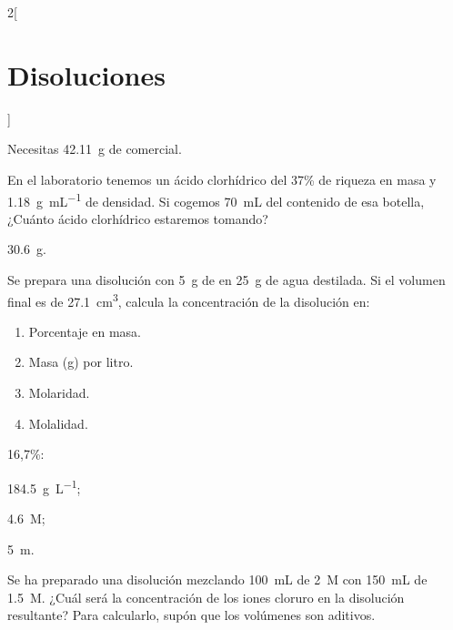 \documentclass[10pt]{article}
\begin{document}
\begin{multicols}{2}[
  \section{Disoluciones}
  ]
  \begin{solution}
    Necesitas \SI{42.11}{\gram} de  comercial.
  \end{solution}




  \begin{exercise}[
      tags    = {termodinámica, entalpía, entalpia de reacción, calor},
      topics  = {química, termoquímica, termodinámica},
      source  = {FQ 1B SAN 2015, p92, e33},
    ]
    En el laboratorio tenemos un ácido clorhídrico del 37\% de riqueza en masa y \SI{1.18}{\gram\per\milli\liter} de densidad. Si cogemos \SI{70}{\milli\liter} del contenido de esa botella, ¿Cuánto ácido
    clorhídrico estaremos tomando?
  \end{exercise}

  \begin{solution}
    \SI{30.6}{\gram}.
  \end{solution}




  \begin{exercise}[
      tags    = {termodinámica, entalpía, entalpia de reacción, calor},
      topics  = {química, termoquímica, termodinámica},
      source  = {FQ 1B OXF 2015, p78, e11},
    ]
    Se prepara una disolución con \SI{5}{\gram} de  en \SI{25}{\gram} de agua destilada. Si el volumen final es de \SI{27.1}{\cubic\centi\meter}, calcula la concentración de la disolución en:
    \begin{enumerate}
      \item Porcentaje en masa.
      \item Masa (\si{\gram}) por litro.
      \item Molaridad.
      \item Molalidad.
    \end{enumerate}
  \end{exercise}

  \begin{solution}
    \begin{enumerate*}
      \item 16,7\%:
      \item \SI{184.5}{\gram\per\liter};
      \item \SI{4.6}{M};
      \item \SI{5}{m}.
    \end{enumerate*}
  \end{solution}



  \begin{exercise}[
      tags    = {termodinámica, entalpía, entalpia de reacción, calor},
      topics  = {química, termoquímica, termodinámica},
      source  = {FQ 1B SAN 2015, p94, e63},
    ]
    Se ha preparado una disolución mezclando \SI{100}{\milli\liter} de  \SI{2}{M} con \SI{150}{\milli\liter} de  \SI{1.5}{M}.
    ¿Cuál será la concentración de los iones cloruro en la disolución resultante? Para calcularlo, supón que los volúmenes son aditivos.
  \end{exercise}


\end{multicols}
\end{document}
